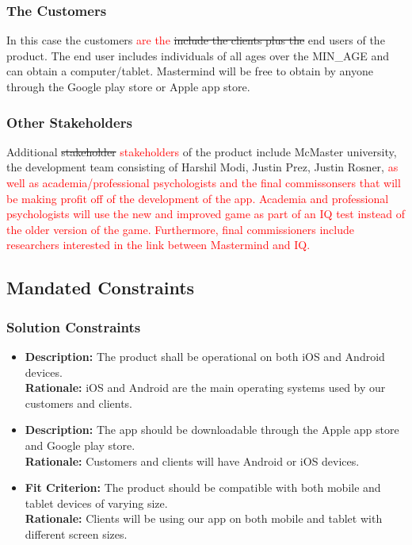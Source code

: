 \documentclass[12pt, titlepage]{article}
\begin{document}
\subsubsection{The Customers}
In this case the customers \textcolor{red}{are the} \sout{include the clients plus the} end users of the product. The end user includes individuals of all ages over the MIN\_AGE and can obtain a computer/tablet. Mastermind will be free to obtain by anyone through the Google play store or Apple app store.

\subsubsection{Other Stakeholders}
Additional \sout{stakeholder} \textcolor{red}{stakeholders} of the product include McMaster university, the development team consisting of Harshil Modi, Justin Prez, Justin Rosner, \textcolor{red}{as well as academia/professional psychologists and the final commissonsers that will be making profit off of the development of the app. Academia and professional psychologists will use the new and improved game as part of an IQ test instead of the older version of the game. Furthermore, final commissioners include researchers interested in the link between Mastermind and IQ.}

\subsection{Mandated Constraints}

\subsubsection{Solution Constraints}
\begin{itemize}
\item \textbf{Description:} The product shall be operational on both iOS and Android devices.\\
\textbf{Rationale:} iOS and Android are the main operating systems used by our customers and clients.
\item \textbf{Description:} The app should be downloadable through the Apple app store and Google play store.
 \\
\textbf{Rationale:} Customers and clients will have Android or iOS devices.

\item \textbf{Fit Criterion:} The product should be compatible with both mobile and tablet devices of varying size.\\
\textbf{Rationale:} Clients will be using our app on both mobile and tablet with different screen sizes.
\end{itemize}
\end{document}

